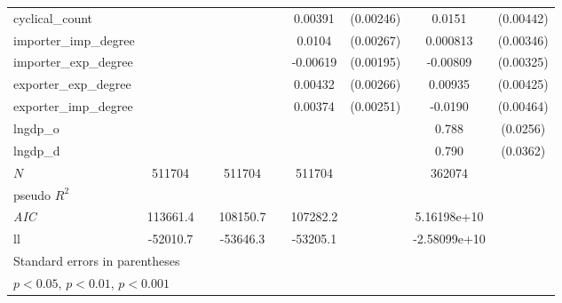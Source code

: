 {\begin{tabular}{l*{4}{cc}}
cyclical\_count&                  &         &                  &         &  0.00391         &(0.00246)&   0.0151\sym{***}&(0.00442)\\
importer\_imp\_degree&                  &         &                  &         &   0.0104\sym{***}&(0.00267)& 0.000813         &(0.00346)\\
importer\_exp\_degree&                  &         &                  &         & -0.00619\sym{**} &(0.00195)& -0.00809\sym{*}  &(0.00325)\\
exporter\_exp\_degree&                  &         &                  &         &  0.00432         &(0.00266)&  0.00935\sym{*}  &(0.00425)\\
exporter\_imp\_degree&                  &         &                  &         &  0.00374         &(0.00251)&  -0.0190\sym{***}&(0.00464)\\
lngdp\_o   &                  &         &                  &         &                  &         &    0.788\sym{***}& (0.0256)\\
lngdp\_d   &                  &         &                  &         &                  &         &    0.790\sym{***}& (0.0362)\\
\hline
\(N\)     &   511704         &         &   511704         &         &   511704         &         &   362074         &         \\
pseudo \(R^{2}\)&                  &         &                  &         &                  &         &                  &         \\
\textit{AIC}& 113661.4         &         & 108150.7         &         & 107282.2         &         &5.16198e+10         &         \\
ll        & -52010.7         &         & -53646.3         &         & -53205.1         &         &-2.58099e+10         &         \\
\hline\hline
\multicolumn{9}{l}{\footnotesize Standard errors in parentheses}\\
\multicolumn{9}{l}{\footnotesize \sym{*} \(p<0.05\), \sym{**} \(p<0.01\), \sym{***} \(p<0.001\)}\\
\end{tabular}
}
